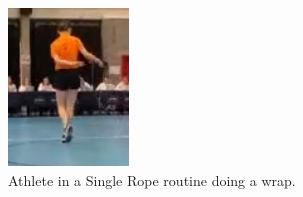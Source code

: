 \begin{figure}
    \centering
    \includegraphics[width=0.4\linewidth]{img/sr.png}
    \caption[Athlete in a Single Rope routine]{Athlete in a Single Rope routine doing a wrap.}
    \label{fig:sr-wrap}
\end{figure}




